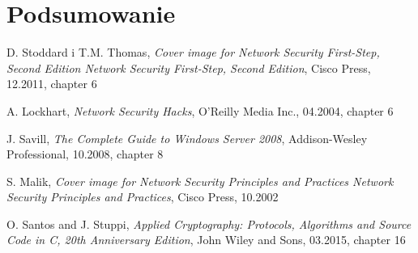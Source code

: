 \documentclass[12p]{article}
\begin{document}
\section{Podsumowanie}
\newpage
\begin{thebibliography}{99}

 D. Stoddard i T.M. Thomas,
\emph{
Cover image for Network Security First-Step, Second Edition
Network Security First-Step, Second Edition},
Cisco Press, 12.2011, chapter 6

 A. Lockhart,
\emph{Network Security Hacks},
O'Reilly Media Inc., 04.2004, chapter 6

 J. Savill,
\emph{The Complete Guide to Windows Server 2008},
Addison-Wesley Professional, 10.2008, chapter 8

 S. Malik,
\emph{Cover image for Network Security Principles and Practices
Network Security Principles and Practices},
Cisco Press, 10.2002

O. Santos and J. Stuppi,
\emph{
Applied Cryptography: Protocols, Algorithms and Source Code in C, 20th Anniversary Edition},
John Wiley and Sons, 03.2015, chapter 16

\end{thebibliography}
\newpage
\listoffigures
{}
\end{document}
